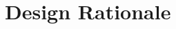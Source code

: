 	
	\section{Design Rationale} \label{s:view-template-design-rationale}
		\begin{comment}
			Design rationale captures the reasoning of the designer that led to the system as designed and the
			justifications of those decisions.
		
			Design rationale may take the form of commentary, made throughout the decision process and associated
			with collections of design elements. Design rationale may include, but is not limited to: design issues raised
			and addressed in response to design concerns; design options considered; trade-offs evaluated; decisions
			made; criteria used to guide design decisions; and arguments and justifications made to reach decisions.
		
			NOTE—The only required design rationale is use of the purpose attribute (4.6.2.3).
		\end{comment}
		
